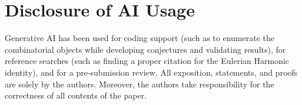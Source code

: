 \documentclass[opre,nonblindrev]{informs3_no_remark}
\begin{document}
\section*{Disclosure of AI Usage}



Generative AI has been used for coding support (such as to enumerate the combinatorial objects while developing conjectures and validating results), for reference searches (such as finding a proper citation for the Eulerian Harmonic identity), and for a pre-submission review. 
All exposition, statements, and proofs are solely by the authors. Moreover, the authors take responsibility for the correctness of all contents of the paper.


 
 
\end{document}
